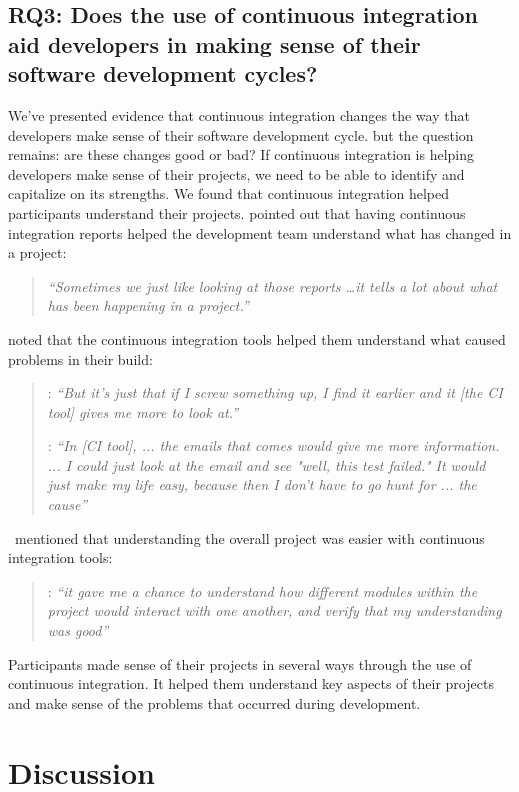 \documentclass{sig-alternate}
\begin{document}
\subsection{RQ3: Does the use of continuous integration aid developers in making sense of their software development cycles?}
We've presented evidence that continuous integration changes the way that developers make sense of their software development cycle. but the question remains: are these changes good or bad? If continuous integration is helping developers make sense of their projects, we need to be able to identify and capitalize on its strengths.
We found that continuous integration helped participants understand their projects. \srutitwo pointed out that having continuous integration reports helped the development team understand what has changed in a project:
\begin{quote}
	\textit{``Sometimes we just like looking at those reports \ldots it tells a lot about what has been happening  in a project.''} 
\end{quote}
\caius noted that the continuous integration tools helped them understand what caused problems in their build:
\begin{quote}
	\caius: \textit{``But it's just that if I screw something up, I find it earlier and it [the CI tool] gives me more to look at.''}
	
	\caius: \textit{``In [CI tool], ... the emails that comes would give me more information. ... I could just look at the email and see "well, this test failed." It would just make my life easy, because then I don't have to go hunt for ... the cause''}
\end{quote}
\david\ mentioned that understanding the overall project was easier with continuous integration tools:
\begin{quote}
	\david: \textit{``it gave me a chance to understand how different modules within the project would interact with one another, and verify that my understanding was good''}
\end{quote}

Participants made sense of their projects in several ways through the use of continuous integration. It helped them understand key aspects of their projects and make sense of the problems that occurred during development. 
\section{Discussion}
\end{document}
